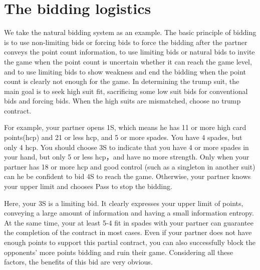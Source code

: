 \documentclass[11pt]{article}
\begin{document}
\section{The bidding logistics}
We take the natural bidding system as an example. The basic principle of bidding is to use non-limiting bids or forcing bids to  force the bidding after the partner conveys the point count information, to use limiting bids or natural bids to invite the game when the point count is uncertain whether it can reach the game level, and to use limiting bids to show weakness and end the bidding when the point count is clearly not enough for the game. In determining the trump suit, the main goal is to seek high suit fit, sacrificing some low suit bids for conventional bids and forcing bids. When the high suits are mismatched, choose no trump contract.

For example, your partner opens 1S, which means he has 11 or more high card points(hcp) and 21 or less hcp, and 5 or more spades. You have 4 spades, but only 4 hcp. You should choose 3S to indicate that you have 4 or more spades in your hand, but only 5 or less hcp，and have no more strength. Only when your partner has 18 or more hcp and good control (such as a singleton in another suit) can he be confident to bid 4S to reach the game. Otherwise, your partner knows your upper limit and chooses Pass to stop the bidding.

Here, your 3S is a limiting bid. It clearly expresses your upper limit of points, conveying a large amount of information and having a small information entropy. At the same time, your at least 5-4 fit in spades with your partner can guarantee the completion of the contract in most cases. Even if your partner does not have enough points to support this partial contract, you can also successfully block the opponents’ more points bidding and ruin their game. Considering all these factors, the benefits of this bid are very obvious.
\end{document}
